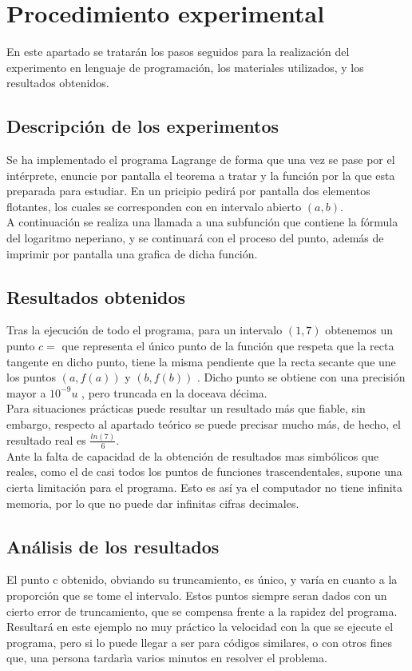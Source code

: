 \documentclass[14pt]{report}
\begin{document}
\pagebreak


\chapter{Procedimiento experimental}
En este apartado se tratarán los pasos seguidos para la realización del experimento en lenguaje de programación, los materiales utilizados, y los resultados obtenidos.
\section{Descripción de los experimentos}
Se ha implementado el programa Lagrange de forma que una vez se pase por el intérprete, enuncie por pantalla el teorema a tratar y la función por la que esta preparada para estudiar.
En un pricipio pedirá por pantalla dos elementos flotantes, los cuales se corresponden con en intervalo abierto $ (a,b) $. \\
A continuación se realiza una llamada a una subfunción que contiene la fórmula del logaritmo neperiano, y se continuará con el proceso del punto, además de imprimir por pantalla una grafica de dicha función. 
\section{Resultados obtenidos}
Tras la ejecución de todo el programa, para un intervalo $ (1,7) $ obtenemos un punto $ c = $ que representa el único punto de la función que respeta que la recta tangente en dicho punto, 
tiene la misma pendiente que la recta secante que une los puntos $ (a,f(a)) $ y $ (b,f(b)) $ . Dicho punto se obtiene con una precisión mayor a $ 10^{-9} u $ , pero truncada en la doceava décima.\\
Para situaciones prácticas puede resultar un resultado más que fiable, sin embargo, respecto al apartado teórico se puede precisar mucho más, de hecho, el resultado real es $ \frac{ln(7)}{6} $. \\
Ante la falta de capacidad de la obtención de resultados mas simbólicos que reales, como el de casi todos los puntos de funciones trascendentales, supone una cierta limitación para el programa.
Esto es así ya el computador no tiene infinita memoria, por lo que no puede dar infinitas cifras decimales. 
\section{Análisis de los resultados}
El punto c obtenido, obviando su truncamiento, es único, y varía en cuanto a la proporción que se tome el intervalo. Estos puntos siempre seran dados con un cierto error de truncamiento, que se compensa 
frente a la rapidez del programa.\\
Resultará en este ejemplo no muy práctico la velocidad con la que se ejecute el programa, pero si lo puede llegar a ser para códigos similares, o con otros fines que, una persona tardarìa varios minutos en resolver el problema.
\end{document}
